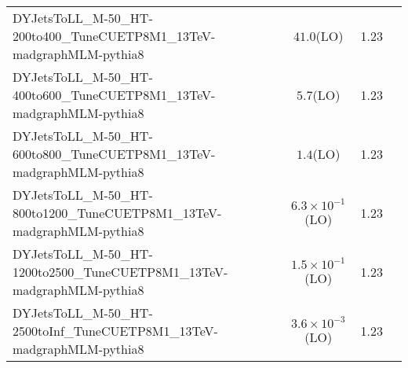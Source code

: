 \begin{tabular}{|l|cc|c|}
    DYJetsToLL\_M-50\_HT-200to400\_TuneCUETP8M1\_13TeV-madgraphMLM-pythia8            &     $41.0$(LO)                  & 1.23  \\
    DYJetsToLL\_M-50\_HT-400to600\_TuneCUETP8M1\_13TeV-madgraphMLM-pythia8            &     $5.7$(LO)                   & 1.23  \\
    DYJetsToLL\_M-50\_HT-600to800\_TuneCUETP8M1\_13TeV-madgraphMLM-pythia8            &     $1.4$(LO)                   & 1.23  \\
    DYJetsToLL\_M-50\_HT-800to1200\_TuneCUETP8M1\_13TeV-madgraphMLM-pythia8           &     $6.3\times 10^{-1}$(LO)     & 1.23  \\
    DYJetsToLL\_M-50\_HT-1200to2500\_TuneCUETP8M1\_13TeV-madgraphMLM-pythia8          &     $1.5\times 10^{-1}$(LO)     & 1.23  \\
    DYJetsToLL\_M-50\_HT-2500toInf\_TuneCUETP8M1\_13TeV-madgraphMLM-pythia8           &     $3.6\times 10^{-3}$(LO)     & 1.23  \\
    \hline
\end{tabular}
